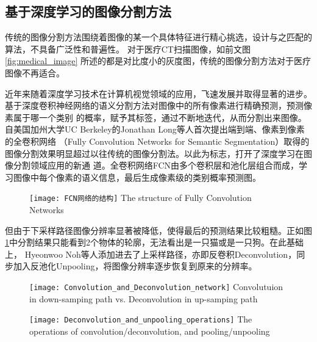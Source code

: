 	\subsection{基于深度学习的图像分割方法}
	
	传统的图像分割方法围绕着图像的某一个具体特征进行精心挑选，设计与之匹配的算法，不具备广泛性和普遍性。 对于医疗CT扫描图像，如前文图\ref{fig:medical_image}
	所述的都是对比度小的灰度图，传统的图像分割方法对于医疗图像不再适合。
	
	近年来随着深度学习技术在计算机视觉领域的应用，飞速发展并取得显著的进步。 基于深度卷积神经网络的语义分割方法对图像中的所有像素进行精确预测，预测像素属于哪一个类别
	的概率，赋予其标签，通过不断地迭代，从而分割出来图像。自美国加州大学UC Berkeley的Jonathan Long等人\cite{long2015fully}首次提出端到端、像素到像素的全卷积网络
	（Fully Convolution Networks for Semantic Segmentation）取得的图像分割效果明显超过以往传统的图像分割法。以此为标志，打开了深度学习在图像分割领域应用的新通
	道。全卷积网络FCN由多个卷积层和池化层组合而成，学习图像中每个像素的语义信息，最后生成像素级的类别概率预测图。
	\begin{figure}[!htp]
		\centering
		\texttt{[image: FCN网络的结构]}
			{The structure of Fully Convolution Networks}
		\label{fig:FCN}
	\end{figure}
	
	但由于下采样路径图像分辨率显著被降低，使得最后的预测结果比较粗糙。正如图\ref{fig:FCN}中分割结果只能看到2个物体的轮廓，无法看出是一只猫或是一只狗。在此基础上，
	Hyeonwoo Noh等人\cite{Noh2015LearningDN}添加进去了上采样路径，亦即反卷积Deconvolution，同步加入反池化Unpooling，将图像分辨率逐步恢复到原来的分辨率。
	\begin{figure}[!htp]
		\centering
		\texttt{[image: Convolution\_and\_Deconvolution\_network]}
			{Convolutuion in down-samping path vs. Deconvolution in up-samping path}
		\label{fig:conv_deconv}
	\end{figure}
	\begin{figure}[!htp]
		\centering
		\texttt{[image: Deconvolution\_and\_unpooling\_operations]}
			{The operations of convolution/deconvolution, and pooling/unpooling}
		\label{fig:conv_deconv_pooling_unpooling}
	\end{figure}
	
